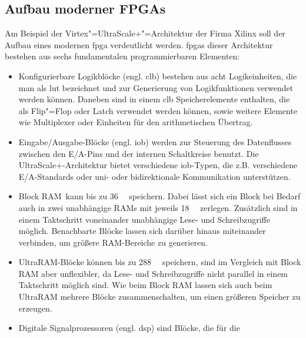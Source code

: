 \subsection{Aufbau moderner FPGAs}\label{fpga:ueberblick:aufbau}

Am Beispiel der Virtex"=UltraScale+"=Architektur der Firma Xilinx soll der
Aufbau eines modernen \gls{fpga} verdeutlicht werden. \gls{fpga}s dieser
Architektur bestehen aus sechs fundamentalen programmierbaren Elementen:
\begin{itemize}
    \item Konfigurierbare Logikblöcke (engl. \gls{clb}) bestehen aus acht
          Logikeinheiten, die man als \gls{lut} bezeichnet und zur
          Generierung von Logikfunktionen verwendet werden können. Daneben sind
          in einem \gls{clb} Speicherelemente enthalten, die als Flip"=Flop oder
          Latch verwendet werden können, sowie weitere Elemente wie Multiplexer
          oder Einheiten für den arithmetischen Übertrag.
          \cite[vgl.][6]{ultrascaleclb2017}
    \item Eingabe/Ausgabe-Blöcke (engl. \gls{iob}) werden zur Steuerung des
          Datenflusses zwischen den E/A-Pins und der internen Schaltkreise
          benutzt. Die UltraScale+-Architektur bietet verschiedene
          \gls{iob}-Typen, die z.B. verschiedene E/A-Standards oder uni- oder
          bidirektionale Kommunikation unterstützen. \cite[vgl. die
          ausführliche E/A"=Beschreibung in][Kapitel 1 und 2]{ultrascaleio2019}
    \item \glqq Block RAM\grqq\ kann bis zu \SI{36}{\kilo\bit} speichern. Dabei
          lässt sich ein Block bei Bedarf auch in zwei unabhängige RAMs mit
          jeweils \SI{18}{\kilo\bit} zerlegen. Zusätzlich sind in einem
          Taktschritt voneinander unabhängige Lese- und Schreibzugriffe möglich.
          Benachbarte Blöcke lassen sich darüber hinaus miteinander verbinden,
          um größere RAM-Bereiche zu generieren.
          \cite[vgl.][6]{ultrascalemem2019}
    \item UltraRAM-Blöcke können bis zu \SI{288}{\kilo\bit} speichern, sind im
          Vergleich mit Block RAM aber unflexibler, da Lese- und Schreibzugriffe
          nicht parallel in einem Taktschritt möglich sind. Wie beim Block RAM
          lassen sich auch beim UltraRAM mehrere Blöcke zusammenschalten, um
          einen größeren Speicher zu erzeugen.
          \cite[vgl.][92--94]{ultrascalemem2019}
    \item Digitale Signalprozessoren (engl. \gls{dsp}) sind Blöcke, die für die

\end{itemize}
